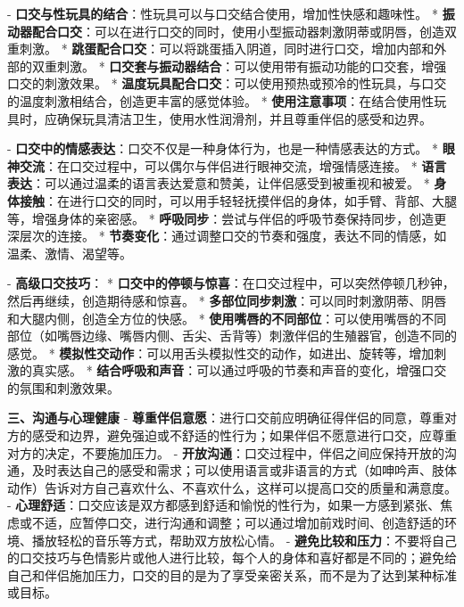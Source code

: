 \begin{enumerate}
  - \textbf{口交与性玩具的结合}：性玩具可以与口交结合使用，增加性快感和趣味性。
    * \textbf{振动器配合口交}：可以在进行口交的同时，使用小型振动器刺激阴蒂或阴唇，创造双重刺激。
    * \textbf{跳蛋配合口交}：可以将跳蛋插入阴道，同时进行口交，增加内部和外部的双重刺激。
    * \textbf{口交套与振动器结合}：可以使用带有振动功能的口交套，增强口交的刺激效果。
    * \textbf{温度玩具配合口交}：可以使用预热或预冷的性玩具，与口交的温度刺激相结合，创造更丰富的感觉体验。
    * \textbf{使用注意事项}：在结合使用性玩具时，应确保玩具清洁卫生，使用水性润滑剂，并且尊重伴侣的感受和边界。
  
  - \textbf{口交中的情感表达}：口交不仅是一种身体行为，也是一种情感表达的方式。
    * \textbf{眼神交流}：在口交过程中，可以偶尔与伴侣进行眼神交流，增强情感连接。
    * \textbf{语言表达}：可以通过温柔的语言表达爱意和赞美，让伴侣感受到被重视和被爱。
    * \textbf{身体接触}：在进行口交的同时，可以用手轻轻抚摸伴侣的身体，如手臂、背部、大腿等，增强身体的亲密感。
    * \textbf{呼吸同步}：尝试与伴侣的呼吸节奏保持同步，创造更深层次的连接。
    * \textbf{节奏变化}：通过调整口交的节奏和强度，表达不同的情感，如温柔、激情、渴望等。
  
  - \textbf{高级口交技巧}：
    * \textbf{口交中的停顿与惊喜}：在口交过程中，可以突然停顿几秒钟，然后再继续，创造期待感和惊喜。
    * \textbf{多部位同步刺激}：可以同时刺激阴蒂、阴唇和大腿内侧，创造全方位的快感。
    * \textbf{使用嘴唇的不同部位}：可以使用嘴唇的不同部位（如嘴唇边缘、嘴唇内侧、舌尖、舌背等）刺激伴侣的生殖器官，创造不同的感觉。
    * \textbf{模拟性交动作}：可以用舌头模拟性交的动作，如进出、旋转等，增加刺激的真实感。
    * \textbf{结合呼吸和声音}：可以通过呼吸的节奏和声音的变化，增强口交的氛围和刺激效果。

  \textbf{三、沟通与心理健康}
  - \textbf{尊重伴侣意愿}：进行口交前应明确征得伴侣的同意，尊重对方的感受和边界，避免强迫或不舒适的性行为；如果伴侣不愿意进行口交，应尊重对方的决定，不要施加压力。
  - \textbf{开放沟通}：口交过程中，伴侣之间应保持开放的沟通，及时表达自己的感受和需求；可以使用语言或非语言的方式（如呻吟声、肢体动作）告诉对方自己喜欢什么、不喜欢什么，这样可以提高口交的质量和满意度。
  - \textbf{心理舒适}：口交应该是双方都感到舒适和愉悦的性行为，如果一方感到紧张、焦虑或不适，应暂停口交，进行沟通和调整；可以通过增加前戏时间、创造舒适的环境、播放轻松的音乐等方式，帮助双方放松心情。
  - \textbf{避免比较和压力}：不要将自己的口交技巧与色情影片或他人进行比较，每个人的身体和喜好都是不同的；避免给自己和伴侣施加压力，口交的目的是为了享受亲密关系，而不是为了达到某种标准或目标。


\end{enumerate}
